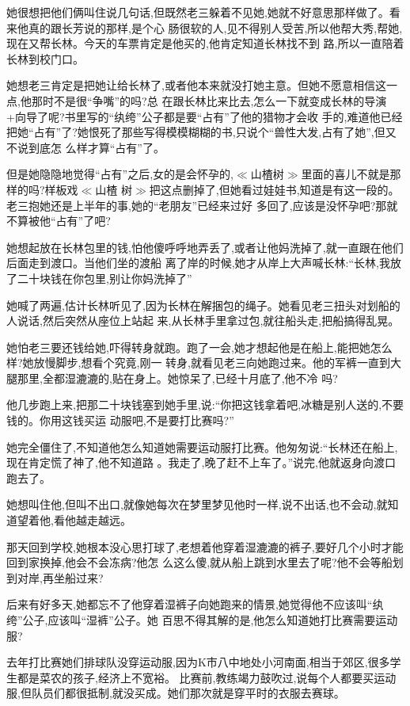 ﻿\documentclass[12pt]{article}
\begin{document}
她很想把他们俩叫住说几句话,但既然老三躲着不见她,她就不好意思那样做了。看来他真的跟长芳说的那样,是个心
肠很软的人,见不得别人受苦,所以他帮大秀,帮她,现在又帮长林。今天的车票肯定是他买的,他肯定知道长林找不到
路,所以一直陪着长林到校门口。

她想老三肯定是把她让给长林了,或者他本来就没打她主意。但她不愿意相信这一点,他那时不是很``争嘴''的吗?总
在跟长林比来比去,怎么一下就变成长林的导演+向导了呢?书里写的``纨绔''公子都是要``占有''了他的猎物才会收
手的,难道他已经把她``占有''了?她恨死了那些写得模模糊糊的书,只说个``兽性大发,占有了她'',但又不说到底怎
么样才算``占有''了。

但是她隐隐地觉得``占有''之后,女的是会怀孕的,$\ll$山楂树$\gg$里面的喜儿不就是那样的吗?样板戏$\ll$山楂
树$\gg$把这点删掉了,但她看过娃娃书,知道是有这一段的。老三抱她还是上半年的事,她的``老朋友''已经来过好
多回了,应该是没怀孕吧?那就不算被他``占有''了吧?

她想起放在长林包里的钱,怕他傻呼呼地弄丢了,或者让他妈洗掉了,就一直跟在他们后面走到渡口。当他们坐的渡船
离了岸的时候,她才从岸上大声喊长林:``长林,我放了二十块钱在你包里,别让你妈洗掉了\myrule ''

她喊了两遍,估计长林听见了,因为长林在解捆包的绳子。她看见老三扭头对划船的人说话,然后突然从座位上站起
来,从长林手里拿过包,就往船头走,把船搞得乱晃。

她怕老三要还钱给她,吓得转身就跑。跑了一会,她才想起他是在船上,能把她怎么样?她放慢脚步,想看个究竟,刚一
转身,就看见老三向她跑过来。他的军裤一直到大腿那里,全都湿漉漉的,贴在身上。她惊呆了,已经十月底了,他不冷
吗?

他几步跑上来,把那二十块钱塞到她手里,说:``你把这钱拿着吧,冰糖是别人送的,不要钱的。你用这钱\myrule 买运
动服吧,不是要打比赛吗?''

她完全僵住了,不知道他怎么知道她需要运动服打比赛。他匆匆说:``长林还在船上,现在肯定慌了神了,他不知道路
\myrule 。我走了,晚了赶不上车了。''说完,他就返身向渡口跑去了。

她想叫住他,但叫不出口,就像她每次在梦里梦见他时一样,说不出话,也不会动,就知道望着他,看他越走越远。

那天回到学校,她根本没心思打球了,老想着他穿着湿漉漉的裤子,要好几个小时才能回到家换掉,他会不会冻病?他怎
么这么傻,就从船上跳到水里去了呢?他不会等船划到对岸,再坐船过来?

后来有好多天,她都忘不了他穿着湿裤子向她跑来的情景,她觉得他不应该叫``纨绔''公子,应该叫``湿裤''公子。她
百思不得其解的是,他怎么知道她打比赛需要运动服?

去年打比赛她们排球队没穿运动服,因为K市八中地处小河南面,相当于郊区,很多学生都是菜农的孩子,经济上不宽裕。
比赛前,教练竭力鼓吹过,说每个人都要买运动服,但队员们都很抵制,就没买成。她们那次就是穿平时的衣服去赛球。
\end{document}
